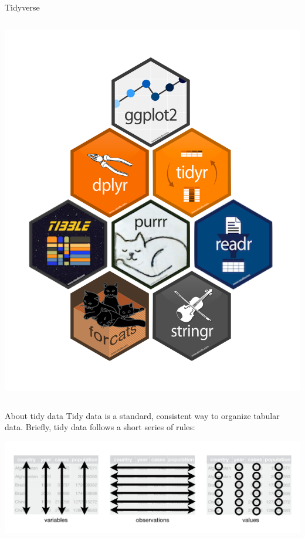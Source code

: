 \documentclass[
  ignorenonframetext,
  aspectratio=169,
]{beamer}
\begin{document}
\begin{frame}{Tidyverse}
\begin{columns}[T]
\begin{column}{0.6\textwidth}
\includegraphics[width=1\textwidth,height=\textheight]{Intro_R_files/mediabag/tidyverse-packages.png}
\end{column}
\end{columns}
\end{frame}

\begin{frame}{About tidy data}
\label{about-tidy-data}
Tidy data is a standard, consistent way to organize tabular data.
Briefly, tidy data follows a short series of rules:

\includegraphics[width=1\textwidth,height=\textheight]{Intro_R_files/mediabag/tidy1.png}

\end{frame}
\end{document}
